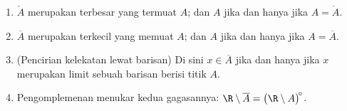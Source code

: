 \begin{proposition}\label{prop:b1:topology:closureprops}
\begin{enumerate}
  \item $\mathring A$ merupakan  terbesar yang termuat $A$; dan $A$
         jika dan hanya jika $A = \mathring A$.
  \item $\overline A$ merupakan  terkecil yang memuat $A$; dan $A$
         jika dan hanya jika $A = \overline A$.
  \item (Pencirian kelekatan lewat barisan) Di sini $x \in \overline
        A$ jika dan hanya jika $x$ merupakan limit sebuah barisan berisi titik
        $A$.
  \item Pengomplemenan menukar kedua gagasannya: $\R \setminus
        \overline A = \bigl(\R \setminus A\bigr)^{\!\circ}$.
\end{enumerate}
\end{proposition}

